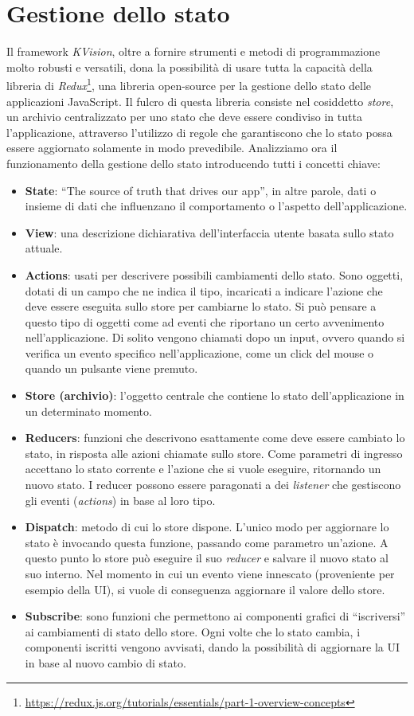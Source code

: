 \section{Gestione dello stato}\label{section:state-management}
Il framework \textit{KVision}, oltre a fornire strumenti e metodi di programmazione molto robusti e versatili, dona la possibilità di usare tutta la capacità della libreria di \textit{Redux}\footnote{\url{https://redux.js.org/tutorials/essentials/part-1-overview-concepts}}, una libreria open-source per la gestione dello stato delle applicazioni JavaScript. Il fulcro di questa libreria consiste nel cosiddetto \textit{store}, un archivio centralizzato per uno stato che deve essere condiviso in tutta l'applicazione, attraverso l'utilizzo di regole che garantiscono che lo stato possa essere aggiornato solamente in modo prevedibile. Analizziamo ora il funzionamento della gestione dello stato introducendo tutti i concetti chiave: 
\begin{itemize}	
	\item \textbf{State}: ``The source of truth that drives our app'', in altre parole, dati o insieme di dati che influenzano il comportamento o l'aspetto dell'applicazione. 	
	\item \textbf{View}: una descrizione dichiarativa dell'interfaccia utente basata sullo stato attuale.
	\item \textbf{Actions}: usati per descrivere possibili cambiamenti dello stato. Sono oggetti, dotati di un campo che ne indica il tipo, incaricati a indicare l'azione che deve essere eseguita sullo store per cambiarne lo stato. Si può pensare a questo tipo di oggetti come ad eventi che riportano un certo avvenimento nell'applicazione. Di solito vengono chiamati dopo un input, ovvero quando si verifica un evento specifico nell'applicazione, come un click del mouse o quando un pulsante viene premuto.
	\item \textbf{Store (archivio)}: l'oggetto centrale che contiene lo stato dell'applicazione in un determinato momento.
	\item \textbf{Reducers}: funzioni che descrivono esattamente come deve essere cambiato lo stato, in risposta alle azioni chiamate sullo store. Come parametri di ingresso accettano lo stato corrente e l'azione che si vuole eseguire, ritornando un nuovo stato. I reducer possono essere paragonati a dei \textit{listener} che gestiscono gli eventi (\textit{actions}) in base al loro tipo.
	\item \textbf{Dispatch}: metodo di cui lo store dispone. L'unico modo per aggiornare lo stato è invocando questa funzione, passando come parametro un'azione.  A questo punto lo store può eseguire il suo \textit{reducer} e salvare il nuovo stato al suo interno. Nel momento in cui un evento viene innescato (proveniente per esempio della \ac{UI}), si vuole di conseguenza aggiornare il valore dello store.
	\item \textbf{Subscribe}: sono funzioni che permettono ai componenti grafici di ``iscriversi'' ai cambiamenti di stato dello store. Ogni volte che lo stato cambia, i componenti iscritti vengono avvisati, dando la possibilità di aggiornare la \ac{UI} in base al nuovo cambio di stato.
\end{itemize}
